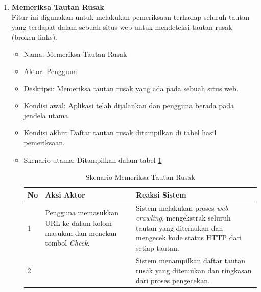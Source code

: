 \begin{enumerate}
    \item \textbf{Memeriksa Tautan Rusak}\\  
    Fitur ini digunakan untuk melakukan pemeriksaan terhadap seluruh tautan yang terdapat dalam sebuah situs web untuk mendeteksi tautan rusak (broken links).  
    
    \begin{itemize}
    
        \item Nama: Memeriksa Tautan Rusak
        
        \item Aktor: Pengguna
        
        \item Deskripsi: Memeriksa tautan rusak yang ada pada sebuah situs web.
        
        \item Kondisi awal: Aplikasi telah dijalankan dan pengguna berada pada jendela utama.
        
        \item Kondisi akhir: Daftar tautan rusak ditampilkan di tabel hasil pemeriksaan.
        
        \item Skenario utama: Ditampilkan dalam tabel \ref{tab:skenario-01}
        \begin{table}[h]
            \centering
            \caption{Skenario Memeriksa Tautan Rusak}
            \vspace{6pt}
            \begin{tabular}{|p{0.5cm} |p{6cm}| p{6cm}|}\hline
                No & Aksi Aktor & Reaksi Sistem \\ \hline
                1 & Pengguna memasukkan URL ke dalam kolom masukan dan menekan tombol \textit{Check}. & Sistem melakukan proses \textit{web crawling}, mengekstrak seluruh tautan yang ditemukan dan mengecek kode status HTTP dari setiap tautan. \\ \hline
                2 & & Sistem menampilkan daftar tautan rusak yang ditemukan dan ringkasan dari proses pengecekan. \\ \hline
            \end{tabular}
            \label{tab:skenario-01}
        \end{table}

    \end{itemize}
    


\end{enumerate}
